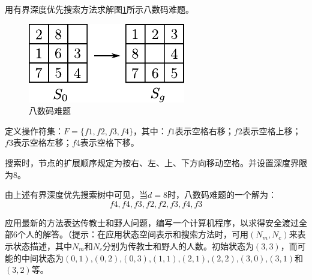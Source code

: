 \begin{question}
用有界深度优先搜索方法求解图\ref{Fig:8-code}所示八数码难题。
	\begin{figure}[H]
		\centering
		\includegraphics{figures/ques-3.7.pdf}
		\caption{八数码难题} \label{Fig:8-code}
	\end{figure}
\end{question}
\begin{solution}
定义操作符集：$F=\{f1,f2,f3,f4\}$，其中：$f1$表示空格右移；$f2$表示空格上移；$f3$表示空格左移；$f4$表示空格下移。\par
搜索时，节点的扩展顺序规定为按右、左、上、下方向移动空格。并设置深度界限为$8$。\par
由上述有界深度优先搜索树中可见，当$d=8$时，八数码难题的一个解为：
\[f4, f4, f3, f2, f2, f3, f4, f3\]
\end{solution}

\begin{question}
应用最新的方法表达传教士和野人问题，编写一个计算机程序，以求得安全渡过全部$6$个人的解答。（提示：在应用状态空间表示和搜索方法时，可用$(N_m,N_c)$来表示状态描述，其中$N_m$和$N_c$分别为传教士和野人的人数。初始状态为$(3,3)$，而可能的中间状态为$(0,1)$,$(0,2)$,$(0,3)$,$(1,1)$,$(2,1)$,$(2,2)$,$(3,0)$,$(3,1)$和$(3,2)$等。
\end{question}
\begin{solution}
\end{solution}

